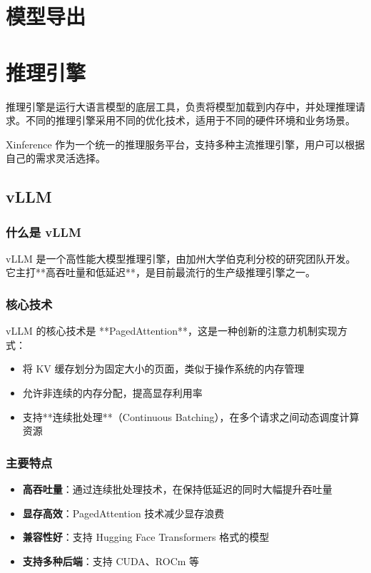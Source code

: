 \documentclass[12pt,UTF8]{ctexbook}
\begin{document}
\section{模型导出}

\section{推理引擎}
\label{sec:inference_engines}

推理引擎是运行大语言模型的底层工具，负责将模型加载到内存中，并处理推理请求。不同的推理引擎采用不同的优化技术，适用于不同的硬件环境和业务场景。

Xinference 作为一个统一的推理服务平台，支持多种主流推理引擎，用户可以根据自己的需求灵活选择。

\subsection{vLLM}
\label{subsec:vllm}

\subsubsection{什么是 vLLM}

vLLM 是一个高性能大模型推理引擎，由加州大学伯克利分校的研究团队开发。它主打**高吞吐量和低延迟**，是目前最流行的生产级推理引擎之一。

\subsubsection{核心技术}

vLLM 的核心技术是 **PagedAttention**，这是一种创新的注意力机制实现方式：

\begin{itemize}[leftmargin=2cm]
    \item 将 KV 缓存划分为固定大小的页面，类似于操作系统的内存管理
    \item 允许非连续的内存分配，提高显存利用率
    \item 支持**连续批处理**（Continuous Batching），在多个请求之间动态调度计算资源
\end{itemize}

\subsubsection{主要特点}

\begin{itemize}[leftmargin=2cm]
    \item \textbf{高吞吐量}：通过连续批处理技术，在保持低延迟的同时大幅提升吞吐量
    \item \textbf{显存高效}：PagedAttention 技术减少显存浪费
    \item \textbf{兼容性好}：支持 Hugging Face Transformers 格式的模型
    \item \textbf{支持多种后端}：支持 CUDA、ROCm 等
\end{itemize}
\end{document}
